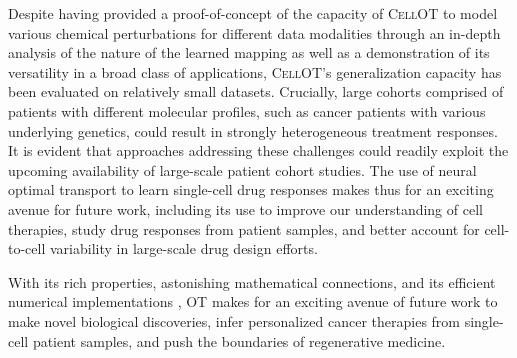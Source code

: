 \smallskip

Despite having provided a proof-of-concept of the capacity of \textsc{CellOT} to model various chemical perturbations for different data modalities through an in-depth analysis of the nature of the learned mapping as well as a demonstration of its versatility in a broad class of applications, \textsc{CellOT}'s generalization capacity has been evaluated on relatively small datasets. Crucially, large cohorts comprised of patients with different molecular profiles, such as cancer patients with various underlying genetics, could result in strongly heterogeneous treatment responses.
It is evident that approaches addressing these challenges could readily exploit the upcoming availability of large-scale patient cohort studies.
The use of neural optimal transport to learn single-cell drug responses makes thus for an exciting avenue for future work,
including its use to improve our understanding of cell therapies, study drug responses from patient samples, and better account for cell-to-cell variability in large-scale drug design efforts.


With its rich properties, astonishing mathematical connections, and its efficient numerical implementations \citep{cuturi2022optimal}, OT makes for an exciting avenue of future work to make novel biological discoveries, infer personalized cancer therapies from single-cell patient samples, and push the boundaries of regenerative medicine.
